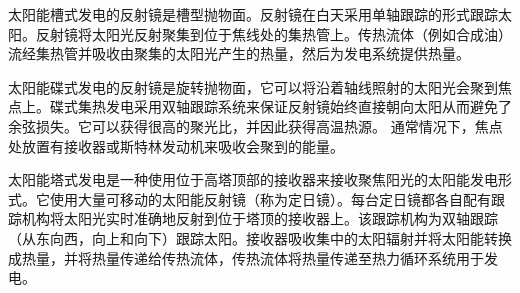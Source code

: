 太阳能槽式发电的反射镜是槽型抛物面。反射镜在白天采用单轴跟踪的形式跟踪太阳。反射镜将太阳光反射聚集到位于焦线处的集热管上。传热流体（例如合成油）流经集热管并吸收由聚集的太阳光产生的热量，然后为发电系统提供热量。

太阳能碟式发电的反射镜是旋转抛物面，它可以将沿着轴线照射的太阳光会聚到焦点上。碟式集热发电采用双轴跟踪系统来保证反射镜始终直接朝向太阳从而避免了余弦损失。它可以获得很高的聚光比，并因此获得高温热源。
通常情况下，焦点处放置有接收器或斯特林发动机来吸收会聚到的能量。

太阳能塔式发电是一种使用位于高塔顶部的接收器来接收聚焦阳光的太阳能发电形式。它使用大量可移动的太阳能反射镜（称为定日镜）。每台定日镜都各自配有跟踪机构将太阳光实时准确地反射到位于塔顶的接收器上。该跟踪机构为双轴跟踪（从东向西，向上和向下）跟踪太阳。接收器吸收集中的太阳辐射并将太阳能转换成热量，并将热量传递给传热流体，传热流体将热量传递至热力循环系统用于发电。

